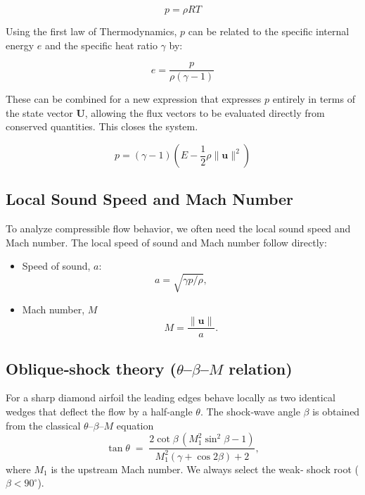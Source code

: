 \documentclass[11pt]{article}
\begin{document}
\begin{equation}
   p = \rho RT 
   \label{IGL}
\end{equation}

Using the first law of Thermodynamics, $p$ can be related to the specific internal energy $e$ and the specific heat ratio $\gamma$ by:

\begin{equation}
   e = \frac{p}{\rho(\gamma-1)}
\end{equation}

These can be combined for a new expression that expresses \( p \) entirely in terms of the state vector \( \mathbf{U} \), allowing the flux vectors to be evaluated directly from conserved quantities. This closes the system.

\begin{equation}
    p = (\gamma - 1)\left(E - \frac{1}{2} \rho\lVert\mathbf{u}\rVert^{2}\right)
\end{equation}
\subsection{Local Sound Speed and Mach Number}
To analyze compressible flow behavior, we often need the local sound speed and Mach number.
The local speed of sound and Mach number follow directly:
\begin{itemize}
  \item Speed of sound, \( a \):
  \begin{equation}
    a = \sqrt{\gamma p/\rho}, \qquad
    \label{speedofsound}
  \end{equation}
  \item Mach number, \( M \) 
  \begin{equation}
    M = \frac{\lVert\mathbf{u}\rVert}{a}.
    \label{Mach_equation}
  \end{equation}
\end{itemize}

\subsection{Oblique‑shock theory ($\theta$–$\beta$–$M$ relation)}
For a sharp diamond airfoil the leading edges behave locally as two
identical wedges that deflect the flow by a half‑angle $\theta$.  The
shock‑wave angle $\beta$ is obtained from the classical $\theta$–$\beta$–$M$ equation
\begin{equation}
  \tan\theta \;=\;
  \frac{2\cot\beta\,(M_1^{2}\sin^{2}\beta-1)}
       {M_1^{2}(\gamma+\cos2\beta)+2},
  \label{eq:theta-beta-M}
\end{equation}
where $M_{1}$ is the upstream Mach number.  We always select the weak‑
shock root ($\beta < 90^{\circ}$).
\end{document}
